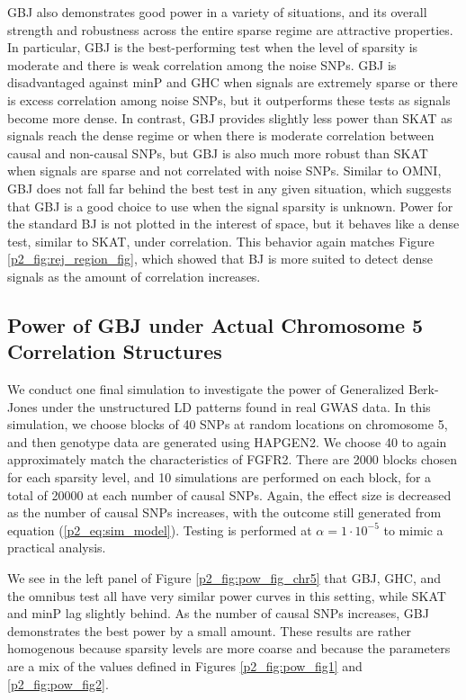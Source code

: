 \documentclass[12pt]{article}
\begin{document}
GBJ also demonstrates good power in a variety of situations, 
and its overall strength and robustness across the entire sparse
regime are attractive properties.
In particular, GBJ is the best-performing test when the 
level of sparsity is moderate and there is weak correlation among the noise SNPs. 
GBJ is disadvantaged against minP and GHC when signals are extremely sparse or there
is excess correlation among noise SNPs, but it outperforms these tests as signals become more dense.
In contrast, GBJ provides slightly less power than SKAT as signals reach the dense regime or
when there is moderate correlation between causal and non-causal SNPs, but GBJ
is also much more robust than SKAT when signals are sparse and not correlated with 
noise SNPs.
Similar to OMNI, GBJ does not fall far behind the best test in any given situation, 
which suggests that GBJ is a good choice to use when the signal sparsity is unknown.
Power for the standard BJ is not plotted in the interest of space, but it behaves like a dense test, similar to 
SKAT, under correlation.  
This behavior again matches Figure \ref{p2_fig:rej_region_fig}, which showed that BJ is more suited to detect 
dense signals as the amount of correlation increases. 


\subsection{Power of GBJ under Actual Chromosome 5 Correlation Structures}
\label{p2_ss:chr5_power}

We conduct one final simulation to investigate the power of Generalized Berk-Jones 
under the unstructured LD patterns found in real GWAS data.  
In this simulation, we choose blocks of 40 SNPs at random locations on chromosome 5, and then genotype
data are generated using HAPGEN2.
We choose 40 to again approximately match the characteristics of FGFR2.
There are 2000 blocks chosen for each sparsity level, and 10 simulations are performed on each block,
for a total of 20000 at each number of causal SNPs.
Again, the effect size is decreased as the number of causal SNPs increases, with the
outcome still generated from equation (\ref{p2_eq:sim_model}).
Testing is performed at $\alpha=1 \cdot 10^{-5}$ to mimic a practical analysis.

We see in the left panel of Figure \ref{p2_fig:pow_fig_chr5} that GBJ, GHC, and the omnibus test all
have very similar power curves in this setting, while SKAT and minP lag slightly behind.
As the number of causal SNPs increases, GBJ demonstrates the best power by a small amount.
These results are rather homogenous because sparsity levels are more coarse
and because the parameters are a mix of
the values defined in Figures \ref{p2_fig:pow_fig1} and \ref{p2_fig:pow_fig2}.
\end{document}
